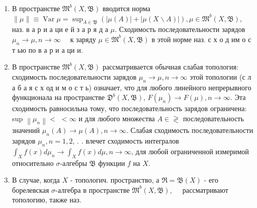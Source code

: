 \documentclass[10pt]{article}
\begin{document}
\begin{enumerate}

  \item В пространстве $\mathfrak{M}^{b}(X, \mathfrak{B})$ вводится норма $\|\mu\| \equiv \operatorname{Var} \mu=\sup _{A \in \mathfrak{B}}(|\mu(A)|+|\mu(X \backslash A)|), \mu \in \mathfrak{M}^{b}(X, \mathfrak{B})$, наз. в а р и а ци е й з а р я д а $\mu$. Сходимость последовательности зарядов $\mu_{n} \rightarrow \mu, n \rightarrow \infty \quad$ к заряду $\mu \in \mathfrak{M}^{b}(X, \mathfrak{B})$ в этой норме наз. с х о д им о с т ью по в а р и а ци и.



  \item В пространстве $\mathfrak{M}^{b}(X, \mathfrak{B})$ рассматривается обычная слабая топология: сходимость последовательности зарядов $\mu_{n} \rightarrow \mu, n \rightarrow \infty$ этой топологии (с л а б а я с х од и м о с т ь) означает, что для любого линейного непрерывного функционала на пространстве $\mathfrak{D}^{b}(X, \mathfrak{B})$, $F\left(\mu_{n}\right) \rightarrow F(\mu), n \rightarrow \infty$. Эта сходимость равносильна тому, что последовательность зарядов ограничена: sup $\left\|\mu_{n}\right\|<$ $<\infty$ и для любого множества $A \in \mathfrak{\gtrless}$ последовательность значений $\mu_{n}(A) \rightarrow \mu(A), n \rightarrow \infty$. Слабая сходимость последовательности зарядов $\mu_{n}, n=1,2$, . . влечет сходимость интегралов $\int_{X} f(x) d \mu_{n} \rightarrow \int_{X} f(x) d \mu, n \rightarrow \infty$, для любой ограниченной измеримой относительно $\sigma$-алгебры $\mathfrak{B}$ функции $f$ на $X$.



  \item В случае, когда $X$ - топологич. пространство, а $\mathfrak{R}=\mathfrak{B}(X)$ - его борелевская $\sigma$-алгебра в пространстве $\mathfrak{M}^{b}(X, \mathfrak{B}), \quad$ рассматривают топологию, также наз.



\end{enumerate}
\end{document}
